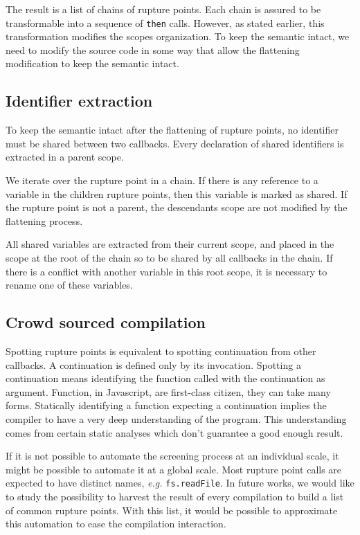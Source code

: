 The result is a list of chains of rupture points.
Each chain is assured to be transformable into a sequence of \texttt{then} calls.
However, as stated earlier, this transformation modifies the scopes organization.
To keep the semantic intact, we need to modify the source code in some way that allow the flattening modification to keep the semantic intact.


\subsection{Identifier extraction} \label{section:compiler:extraction}

To keep the semantic intact after the flattening of rupture points, no identifier must be shared between two callbacks.
Every declaration of shared identifiers is extracted in a parent scope.

We iterate over the rupture point in a chain.
If there is any reference to a variable in the children rupture points, then this variable is marked as shared.
If the rupture point is not a parent, the descendants scope are not modified by the flattening process.

All shared variables are extracted from their current scope, and placed in the scope at the root of the chain so to be shared by all callbacks in the chain.
If there is a conflict with another variable in this root scope, it is necessary to rename one of these variables.



\subsection{Crowd sourced compilation} \label{section:compiler:lib-compilation}

Spotting rupture points is equivalent to spotting continuation from other callbacks.
A continuation is defined only by its invocation.
Spotting a continuation means identifying the function called with the continuation as argument.
Function, in Javascript, are first-class citizen, they can take many forms.
Statically identifying a function expecting a continuation implies the compiler to have a very deep understanding of the program.
This understanding comes from certain static analyses which don't guarantee a good enough result.

If it is not possible to automate the screening process at an individual scale, it might be possible to automate it at a global scale.
Most rupture point calls are expected to have distinct names, \textit{e.g.} \texttt{fs.readFile}.
In future works, we would like to study the possibility to harvest the result of every compilation to build a list of common rupture points.
With this list, it would be possible to approximate this automation to ease the compilation interaction.

